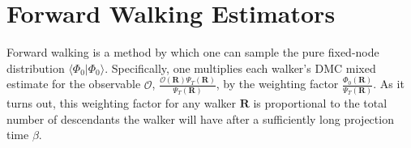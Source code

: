 %
%    
% 
%    
%    


\section{Forward Walking Estimators} \label{sec:forward_walking}
Forward walking is a method by which one can sample the pure fixed-node distribution $\langle \Phi_0 | \Phi_0\rangle$.  Specifically, one multiplies each walker's DMC mixed estimate for the observable $\mathcal{O}$, $\frac{\mathcal{O}(\mathbf{R})\Psi_T(\mathbf{R})}{\Psi_T(\mathbf{R})}$, by the weighting factor $\frac{\Phi_0(\mathbf{R})}{\Psi_T(\mathbf{R})}$.  As it turns out, this weighting factor for any walker $\mathbf{R}$ is proportional to the total number of descendants the walker will have after a sufficiently long projection time $\beta$.  

